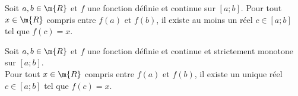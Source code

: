 \def\theme{Théorème des valeurs intermédiaires}
\def\date{08/10/2023}


Soit $a,b\in\m{R}$ et $f$ une fonction définie et continue sur $[a ; b]$.
Pour tout $x\in\m{R}$ compris entre $f(a)$ et $f(b)$, il existe au moins un réel $c\in[a ; b]$ tel que $f(c)=x$.


Soit $a,b\in\m{R}$ et $f$ une fonction définie et continue et strictement monotone sur $[a ; b]$.\\
Pour tout $x\in\m{R}$ compris entre $f(a)$ et $f(b)$, il existe un unique réel $c\in[a ; b]$ tel que $f(c)=x$.